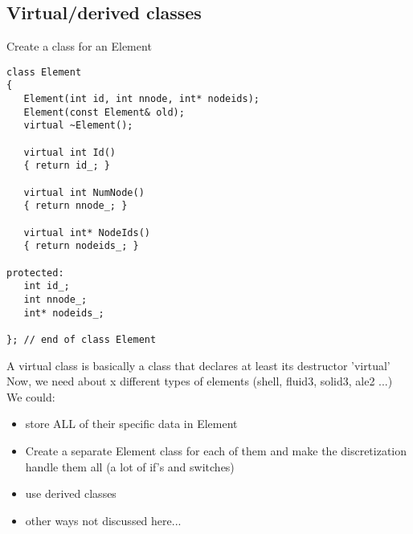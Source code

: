 \subsection{Virtual/derived classes}
Create a class for an Element\\
\begin{boxedminipage}{\linewidth}
\begin{verbatim}
class Element
{
   Element(int id, int nnode, int* nodeids);
   Element(const Element& old);
   virtual ~Element();

   virtual int Id()
   { return id_; }

   virtual int NumNode()
   { return nnode_; }

   virtual int* NodeIds()
   { return nodeids_; }

protected:
   int id_;
   int nnode_;
   int* nodeids_;
   
}; // end of class Element
\end{verbatim}
\end{boxedminipage}
A virtual class is basically a class that
declares at least its destructor 'virtual'
Now, we need about x different types of
elements (shell, fluid3, solid3, ale2 ...)
We could:
\begin{itemize}
\item store ALL of their specific data
in Element
\item Create a separate Element class
for each of them and make the
discretization handle them all
(a lot of if's and switches)
\item use derived classes
\item other ways not discussed here...
\end{itemize}

